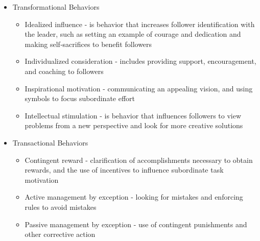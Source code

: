 	\begin{itemize}
		\item Transformational Behaviors
		\begin{itemize}
			\item Idealized influence - is behavior that increases follower identification with the leader, such as setting an example of courage and dedication and making self‐sacrifices to benefit followers
			\item Individualized consideration - includes providing support, encouragement, and coaching to followers
			\item Inspirational motivation - communicating an appealing vision, and using symbols to focus subordinate effort
			\item Intellectual stimulation - is behavior that influences followers to view problems from a new perspective and look for more creative solutions
		\end{itemize}
		\item Transactional Behaviors
		\begin{itemize}
			\item Contingent reward - clarification of accomplishments necessary to obtain rewards, and the use of incentives to influence subordinate task motivation
			\item Active management by exception - looking for mistakes and enforcing rules to avoid mistakes
			\item Passive management by exception - use of contingent punishments and other corrective action 
		\end{itemize}
	\end{itemize}


